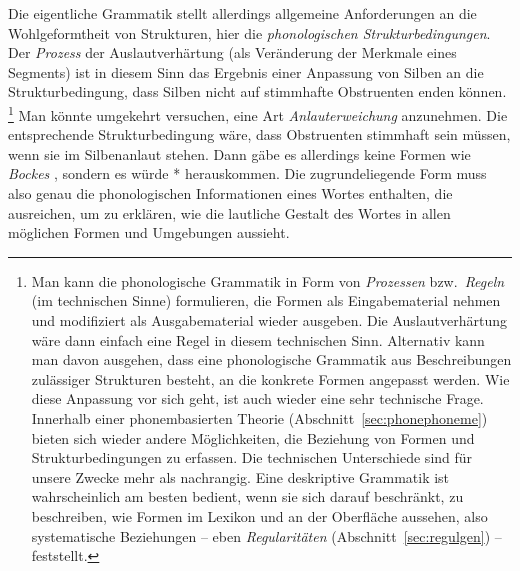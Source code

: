 Die eigentliche Grammatik stellt allerdings allgemeine Anforderungen an die Wohlgeformtheit von Strukturen, hier die \textit{phonologischen Strukturbedingungen}.
Der \textit{Prozess} der Auslautverhärtung (als Veränderung der Merkmale eines Segments) ist in diesem Sinn das Ergebnis einer Anpassung von Silben an die Strukturbedingung, dass Silben nicht auf stimmhafte Obstruenten enden können.%
\footnote{Man kann die phonologische Grammatik in Form von \textit{Prozessen} bzw.\ \textit{Regeln} (im technischen Sinne) formulieren, die Formen als Eingabematerial nehmen und modifiziert als Ausgabematerial wieder ausgeben.
Die Auslautverhärtung wäre dann einfach eine Regel in diesem technischen Sinn.
Alternativ kann man davon ausgehen, dass eine phonologische Grammatik aus Beschreibungen zulässiger Strukturen besteht, an die konkrete Formen angepasst werden.
Wie diese Anpassung vor sich geht, ist auch wieder eine sehr technische Frage.
Innerhalb einer phonembasierten Theorie (Abschnitt~\ref{sec:phonephoneme}) bieten sich wieder andere Möglichkeiten, die Beziehung von Formen und Strukturbedingungen zu erfassen.
Die technischen Unterschiede sind für unsere Zwecke mehr als nachrangig.
Eine deskriptive Grammatik ist wahrscheinlich am besten bedient, wenn sie sich darauf beschränkt, zu beschreiben, wie Formen im Lexikon und an der Oberfläche aussehen, also systematische Beziehungen -- eben \textit{Regularitäten} (Abschnitt~\ref{sec:regulgen}) -- feststellt.}
Man könnte umgekehrt versuchen, eine Art \textit{Anlauterweichung} anzunehmen.
Die entsprechende Strukturbedingung wäre, dass Obstruenten stimmhaft sein müssen, wenn sie im Silbenanlaut stehen.
Dann gäbe es allerdings keine Formen wie \textit{Bockes} \textipa{[bOk@s]}, sondern es würde *\textipa{[bOg@s]} herauskommen.
Die zugrundeliegende Form muss also genau die phonologischen Informationen eines Wortes enthalten, die ausreichen, um zu erklären, wie die lautliche Gestalt des Wortes in allen möglichen Formen und Umgebungen aussieht.


